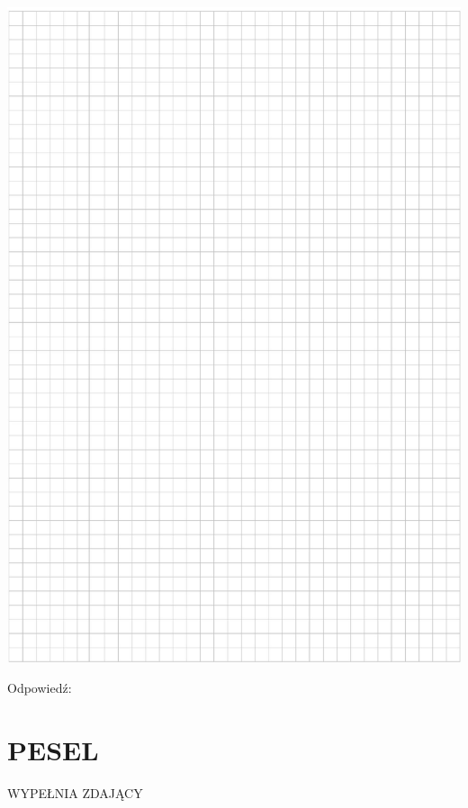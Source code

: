 \documentclass[10pt]{article}
\begin{document}
\begin{center}
\includegraphics[max width=\textwidth]{2024_11_21_8e981e1ab2c7e641f462g-16}
\end{center}

Odpowiedź:

\section*{PESEL}
WYPEŁNIA ZDAJĄCY
\end{document}
